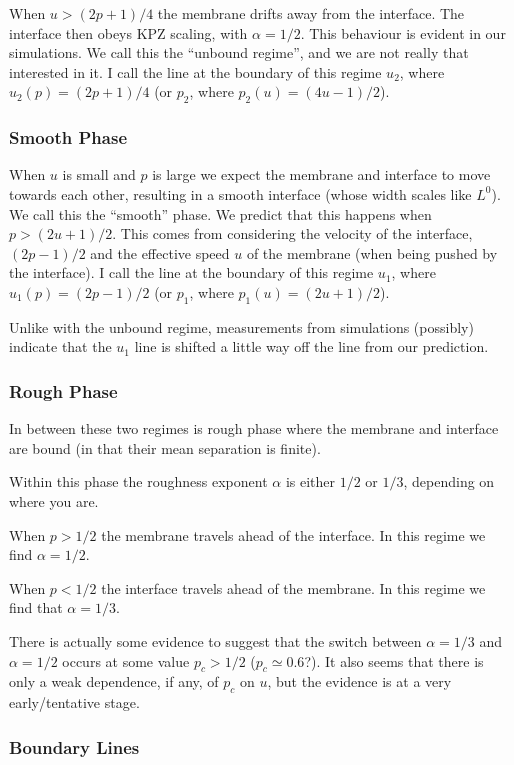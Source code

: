 \documentclass[a4paper,10pt]{article}
\begin{document}
When $u > (2p+1)/4$ the membrane drifts away from the interface. The interface then obeys KPZ scaling, with $\alpha=1/2$. This behaviour is evident in our simulations. We call this the ``unbound regime'', and we are not really that interested in it. I call the line at the boundary of this regime $u_2$, where $u_2(p) = (2p+1)/4$ (or $p_2$, where $p_2(u) = (4u-1)/2$).

\subsubsection{Smooth Phase}

When $u$ is small and $p$ is large we expect the membrane and interface to move towards each other, resulting in a smooth interface (whose width scales like $L^0$). We call this the ``smooth'' phase. We predict that this happens when $p > (2u+1)/2$. This comes from considering the velocity of the interface, $(2p-1)/2$ and the effective speed  $u$ of the membrane (when being pushed by the interface). I call the line at the boundary of this regime $u_1$, where $u_1(p) = (2p-1)/2$ (or $p_1$, where $p_1(u) = (2u+1)/2$).

Unlike with the unbound regime, measurements from simulations (possibly) indicate that the $u_1$ line is shifted a little way off the line from our prediction.

\subsubsection{Rough Phase}

In between these two regimes is rough phase where the membrane and interface are bound (in that their mean separation is finite).

Within this phase the roughness exponent $\alpha$ is either $1/2$ or $1/3$, depending on where you are.

When $p > 1/2$ the membrane travels ahead of the interface. In this regime we find $\alpha=1/2$.

When $p < 1/2$ the interface travels ahead of the membrane. In this regime we find that $\alpha = 1/3$.

There is actually some evidence to suggest that the switch between $\alpha=1/3$ and $\alpha=1/2$ occurs at some value $p_c > 1/2$ ($p_c \simeq 0.6$?). It also seems that there is only a weak dependence, if any, of $p_c$ on $u$, but the evidence is at a very early/tentative stage.

\subsubsection{Boundary Lines}
\end{document}
